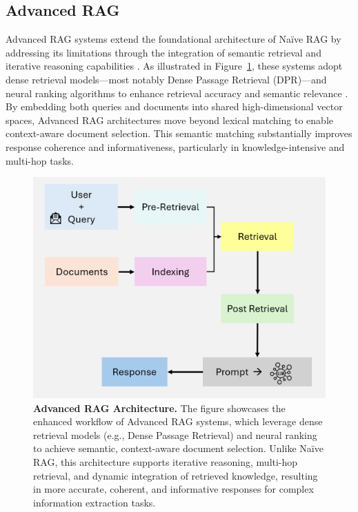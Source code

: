 \subsection{Advanced RAG }

Advanced RAG \cite{gao2024retrievalaugmented}systems extend the foundational architecture of Naïve RAG by addressing its limitations through the integration of semantic retrieval and iterative reasoning capabilities \cite{lewis2020retrieval}. As illustrated in Figure~\ref{fig:advanced_rag_pipeline}, these systems adopt dense retrieval models—most notably Dense Passage Retrieval (DPR)—and neural ranking algorithms to enhance retrieval accuracy and semantic relevance \cite{karpukhin2020dense}. By embedding both queries and documents into shared high-dimensional vector spaces, Advanced RAG architectures move beyond lexical matching to enable context-aware document selection. This semantic matching substantially improves response coherence and informativeness, particularly in knowledge-intensive and multi-hop tasks.

\begin{figure}[h!]
    \centering
    \includegraphics[width=0.9\linewidth]{images/fig_4.png}
    \caption{
        \textbf{Advanced RAG Architecture.}
        The figure showcases the enhanced workflow of Advanced RAG systems, which leverage dense retrieval models (e.g., Dense Passage Retrieval) and neural ranking to achieve semantic, context-aware document selection. Unlike Naïve RAG, this architecture supports iterative reasoning, multi-hop retrieval, and dynamic integration of retrieved knowledge, resulting in more accurate, coherent, and informative responses for complex information extraction tasks.
    }
    \label{fig:advanced_rag_pipeline}
\end{figure}


